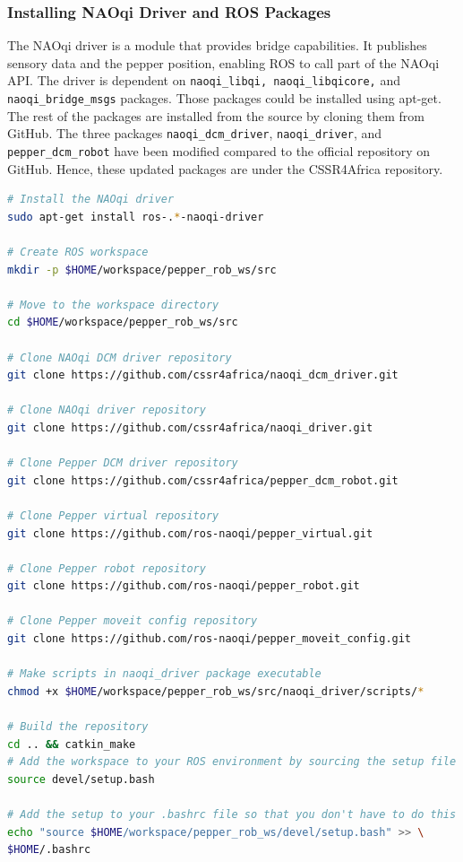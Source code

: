 \documentclass{CSSRforAfrica}
\begin{document}
{\subsubsection*{Installing NAOqi Driver and ROS Packages}

The NAOqi driver is a module that provides bridge capabilities. It publishes sensory data and the pepper position, enabling ROS to call part of the NAOqi API. The driver is dependent on \texttt{naoqi\_libqi, naoqi\_libqicore,} and \texttt{naoqi\_bridge\_msgs} packages. Those packages could be installed using apt-get. The rest of the packages are installed from the source by cloning them from GitHub. The three packages \texttt{naoqi\_dcm\_driver}, \texttt{naoqi\_driver}, and \texttt{pepper\_dcm\_robot} have been modified compared to the official repository on GitHub. Hence, these updated packages are under the CSSR4Africa repository.

\begin{lstlisting}[style=withoutNumbering, language=bash]
# Install the NAOqi driver
sudo apt-get install ros-.*-naoqi-driver
        
# Create ROS workspace
mkdir -p $HOME/workspace/pepper_rob_ws/src
        
# Move to the workspace directory
cd $HOME/workspace/pepper_rob_ws/src
    
# Clone NAOqi DCM driver repository
git clone https://github.com/cssr4africa/naoqi_dcm_driver.git

# Clone NAOqi driver repository
git clone https://github.com/cssr4africa/naoqi_driver.git
    
# Clone Pepper DCM driver repository
git clone https://github.com/cssr4africa/pepper_dcm_robot.git

# Clone Pepper virtual repository
git clone https://github.com/ros-naoqi/pepper_virtual.git

# Clone Pepper robot repository
git clone https://github.com/ros-naoqi/pepper_robot.git
    
# Clone Pepper moveit config repository
git clone https://github.com/ros-naoqi/pepper_moveit_config.git

# Make scripts in naoqi_driver package executable
chmod +x $HOME/workspace/pepper_rob_ws/src/naoqi_driver/scripts/*
    
# Build the repository
cd .. && catkin_make
# Add the workspace to your ROS environment by sourcing the setup file in devel folder
source devel/setup.bash

# Add the setup to your .bashrc file so that you don't have to do this every time you open a new terminal
echo "source $HOME/workspace/pepper_rob_ws/devel/setup.bash" >> \
$HOME/.bashrc


\end{lstlisting}}
\end{document}
